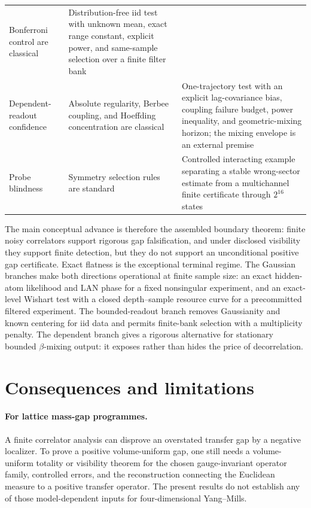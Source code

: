 \documentclass[11pt]{article}
\theoremstyle{definition}
\theoremstyle{remark}
\begin{document}
\begin{table}[H]
\begin{tabularx}{\linewidth}{>{\raggedright\arraybackslash}p{.28\linewidth}
>{\raggedright\arraybackslash}p{.32\linewidth}
>{\raggedright\arraybackslash}X}
Bonferroni control are classical
& Distribution-free iid test with unknown mean, exact range constant, explicit
power, and same-sample selection over a finite filter bank\\
Dependent-readout confidence & Absolute regularity, Berbee coupling, and
Hoeffding concentration are classical
& One-trajectory test with an explicit lag-covariance bias, coupling failure
budget, power inequality, and geometric-mixing horizon; the mixing envelope is
an external premise\\
Probe blindness & Symmetry selection rules are standard
& Controlled interacting example separating a stable wrong-sector estimate
from a multichannel finite certificate through $2^{16}$ states\\
\bottomrule
\end{tabularx}
\end{table}

The main conceptual advance is therefore the assembled boundary theorem:
finite noisy correlators support rigorous gap falsification, and under
disclosed visibility they support finite detection, but they do not support an
unconditional positive gap certificate.  Exact flatness is the exceptional
terminal regime.  The Gaussian branches make both directions operational at
finite sample size: an exact hidden-atom likelihood and LAN phase for a fixed
nonsingular experiment, and an exact-level Wishart test with a closed
depth--sample resource curve for a precommitted filtered experiment.  The
bounded-readout branch removes Gaussianity and known centering for iid data and
permits finite-bank selection with a multiplicity penalty.  The dependent
branch gives a rigorous alternative for stationary bounded $\beta$-mixing
output: it exposes rather than hides the price of decorrelation.

\section{Consequences and limitations}

\paragraph{For lattice mass-gap programmes.}
A finite correlator analysis can disprove an overstated transfer gap by a
negative localizer.  To prove a positive volume-uniform gap, one still needs a
volume-uniform totality or visibility theorem for the chosen gauge-invariant
operator family, controlled errors, and the reconstruction connecting the
Euclidean measure to a positive transfer operator.  The present results do not
establish any of those model-dependent inputs for four-dimensional
Yang--Mills.
\end{document}

